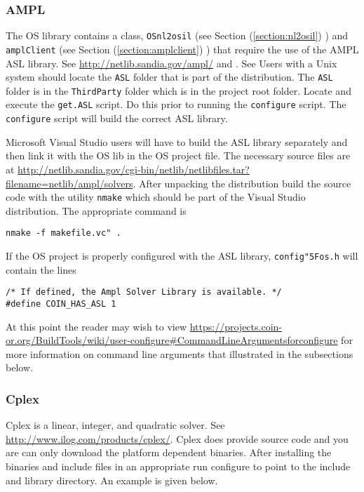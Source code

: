 \documentclass[11pt]{article}
\renewcommand{\_}{{\char"5F}}
\renewcommand{\{}{{\char"7B}}
\renewcommand{\}}{{\char"7D}}
\renewcommand{\^}{{\char"0D}}
\renewcommand{\'}{{\char"0D}}
\begin{document}
\subsubsection{AMPL}

The OS library contains a class, {\tt OSnl2osil} (see Section (\ref{section:nl2osil}) ) and {\tt amplClient} (see Section (\ref{section:amplclient}) ) that require the use of the AMPL ASL library.  See \url{http://netlib.sandia.gov/ampl/}  and  \url{}. See Users with a Unix system should locate the {\tt ASL} folder that is part of the distribution. The {\tt ASL} folder is in the {\tt ThirdParty} folder which is in the project root folder. Locate and execute the {\tt get.ASL} script.  Do this prior to running the {\tt configure} script. The {\tt configure} script will build the correct ASL library. 

Microsoft  Visual Studio users will have to build the ASL library separately and then link it with the OS lib in the OS project file.  The necessary source files are at \url{http://netlib.sandia.gov/cgi-bin/netlib/netlibfiles.tar?filename=netlib/ampl/solvers}.  After unpacking the distribution build the source code with the utility {\tt nmake} which should be part of the Visual Studio distribution. The appropriate command is
\begin{verbatim}
nmake -f makefile.vc" .
\end{verbatim}
If the OS project is properly configured  with the ASL library, {\tt config\_os.h} will contain the lines
\begin{verbatim}
/* If defined, the Ampl Solver Library is available. */
#define COIN_HAS_ASL 1
\end{verbatim}

At this point the reader may wish to view  \url{https://projects.coin-or.org/BuildTools/wiki/user-configure#CommandLineArgumentsforconfigure} for more information on command line arguments that illustrated in the subsections below.


\subsubsection{Cplex}

Cplex is a linear, integer, and quadratic solver. See \url{http://www.ilog.com/products/cplex/}.  Cplex does provide source code and you are can only download the platform dependent binaries. After installing the binaries and include files in an appropriate run configure to point to the include and library directory. An example is given below.
\end{document}
